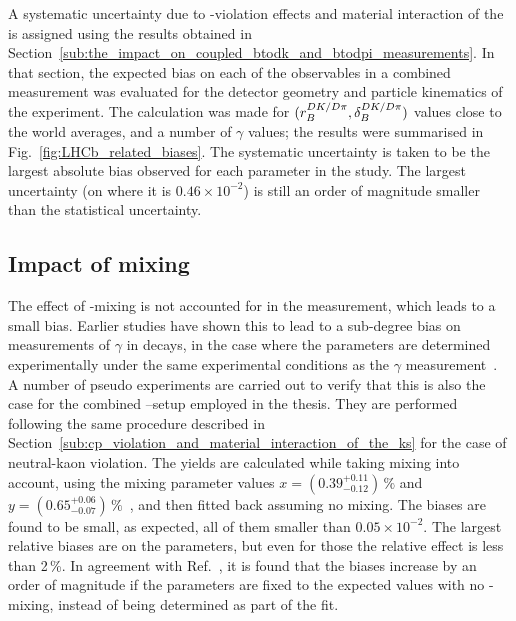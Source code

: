 A systematic uncertainty due to \CP-violation effects and material interaction of the \KS is assigned using the results obtained in Section~\ref{sub:the_impact_on_coupled_btodk_and_btodpi_measurements}. In that section, the expected bias on each of the observables in a combined \BtoDh measurement was evaluated for the detector geometry and particle kinematics of the \lhcb experiment. The calculation was made for $(r_B^{DK/{D}\pi},\delta_B^{DK/{D}\pi})$ values close to the world averages, and a number of $\gamma$ values; the results were summarised in Fig.~\ref{fig:LHCb_related_biases}. 
The systematic uncertainty is taken to be the largest absolute bias observed for each parameter in the study. The largest uncertainty (on \yxidpi where it is $0.46\times 10^{-2}$) is still an order of magnitude smaller than the statistical uncertainty.
 


\subsection{Impact of \D mixing} %
\label{sub:impact_of_d_mixing}

The effect of \D-mixing is not accounted for in the measurement, which leads to a small bias. Earlier studies have shown this to lead to a sub-degree bias on measurements of $\gamma$ in \BtoDK decays, in the case where the \Fi parameters are determined experimentally under the same experimental conditions as the $\gamma$ measurement~\cite{Dmixing}. A number of pseudo experiments are carried out to verify that this is also the case for the combined \DK--\Dpi setup employed in the thesis. They are performed following the same procedure described in Section~\ref{sub:cp_violation_and_material_interaction_of_the_ks} for the case of neutral-kaon \CP violation. The yields are calculated while taking \D mixing into account, using the mixing parameter values $x=(0.39^{+0.11}_{-0.12})\,\%$ and $y=(0.65^{+0.06}_{-0.07})\,\%$~\cite{PDG2020}, and then fitted back assuming no \D mixing. The biases are found to be small, as expected, all of them smaller than $0.05\times 10^{-2}$. The largest relative biases are on the \BtoDpi parameters, but even for those the relative effect is less than 2\,\%. In agreement with Ref.~\cite{Dmixing}, it is found that the biases increase by an order of magnitude if the \Fi parameters are fixed to the expected values with no \D-mixing, instead of being determined as part of the fit.

